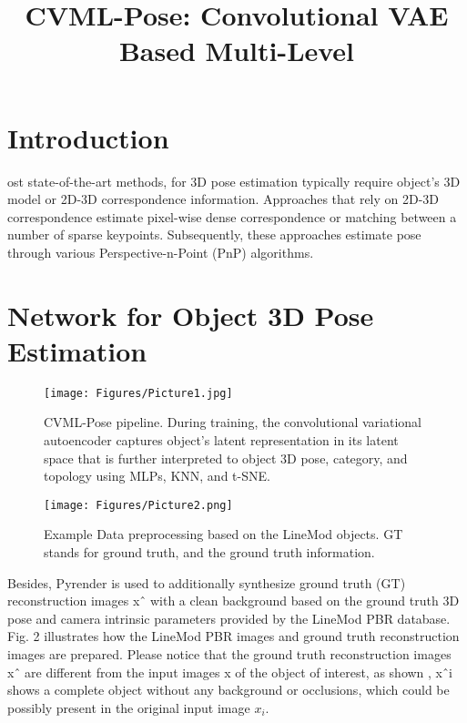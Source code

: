 \documentclass[9pt,a4paper,twoside]{tau}
\title{CVML-Pose: Convolutional VAE Based Multi-Level}
\begin{document}
	
	\maketitle{ }
	\thispagestyle{firststyle}
	\tableofcontents

\section{Introduction}

    ost state-of-the-art methods, for 3D pose estimation typically require object’s 3D model or 2D-3D correspondence information. Approaches that rely on 2D-3D correspondence estimate pixel-wise dense correspondence or matching between a number of sparse keypoints. Subsequently, these approaches estimate pose through various Perspective-n-Point (PnP) algorithms.
    
\section{Network for Object 3D Pose Estimation }
\begin{figure}[H]
                \centering
                \texttt{[image: Figures/Picture1.jpg]}
                \caption{CVML-Pose pipeline. During training, the convolutional variational autoencoder captures object’s latent representation in its latent space that is further interpreted to object 3D pose, category, and topology using MLPs, KNN, and t-SNE.}
                \label{fig:figure}
            \end{figure}
\begin{figure}[H]
                \centering
                \texttt{[image: Figures/Picture2.png]}
                \caption{Example Data preprocessing based on the LineMod  objects. GT stands for ground truth, and the ground truth information.}
                \label{fig:figure}
            \end{figure}
        Besides, Pyrender is used to additionally synthesize ground truth (GT) reconstruction images xˆ with a clean background based on the ground truth 3D pose and camera intrinsic parameters provided by the LineMod PBR database. Fig. 2 illustrates how the LineMod PBR images and ground truth reconstruction images are prepared. Please notice that the ground truth reconstruction images xˆ are different from the input images x of the object of interest, as shown , xˆi shows a complete object without any background or occlusions, which could be possibly present in the original input image $x_i.$
        
\end{document}

